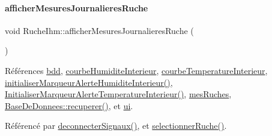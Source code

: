 \mbox{\label{class_ruche_ihm_a94bd98327a73a15aad1306fc31f53ce8}} 
\paragraph{\texorpdfstring{afficher\+Mesures\+Journalieres\+Ruche}{afficherMesuresJournalieresRuche}}
{\footnotesize\ttfamily void Ruche\+Ihm\+::afficher\+Mesures\+Journalieres\+Ruche (\begin{DoxyParamCaption}{ }\end{DoxyParamCaption})\hspace{0.3cm}{\ttfamily [slot]}}



Références \hyperlink{class_ruche_ihm_a0851936fe212e8d40538264f09749153}{bdd}, \hyperlink{class_ruche_ihm_a19a58f5841dc91eb7f84acd419f35678}{courbe\+Humidite\+Interieur}, \hyperlink{class_ruche_ihm_a6ce372c8df13bb78c09705432dcfcf58}{courbe\+Temperature\+Interieur}, \hyperlink{class_ruche_ihm_a42785d6da8aca09d8becb6d500de8d9f}{initialiser\+Marqueur\+Alerte\+Humidite\+Interieur()}, \hyperlink{class_ruche_ihm_a0f44cb030202047fa9a364dfcbf9a13f}{Initialiser\+Marqueur\+Alerte\+Temperature\+Interieur()}, \hyperlink{class_ruche_ihm_ab7741fa67b19cbb2da7eb12c58cf83c1}{mes\+Ruches}, \hyperlink{class_base_de_donnees_a77539baad389f5acf754cd2cd452403e}{Base\+De\+Donnees\+::recuperer()}, et \hyperlink{class_ruche_ihm_a64786058bd7f88ca2f1e9743bb27c25b}{ui}.



Référencé par \hyperlink{class_ruche_ihm_a348a76106f3072dd31a382c6025b8113}{deconnecter\+Signaux()}, et \hyperlink{class_ruche_ihm_a7324ae6ea574ccdad47783f466933157}{selectionner\+Ruche()}.


